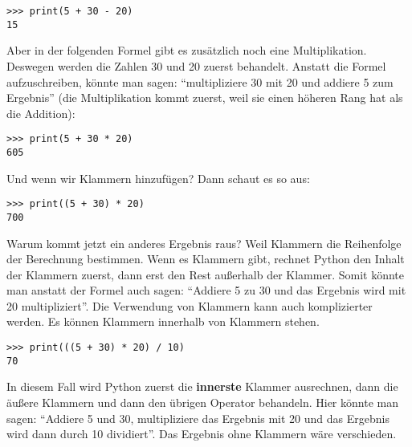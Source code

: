 \begin{Verbatim}[frame=single]
>>> print(5 + 30 - 20)
15
\end{Verbatim}

\noindent
Aber in der folgenden Formel gibt es zusätzlich noch eine Multiplikation. Deswegen werden die Zahlen 30 und 20 zuerst behandelt. Anstatt die Formel aufzuschreiben, könnte man sagen: ``multipliziere 30 mit 20 und addiere 5 zum Ergebnis'' (die Multiplikation kommt zuerst, weil sie einen höheren Rang hat als die Addition):

\begin{Verbatim}[frame=single]
>>> print(5 + 30 * 20)
605
\end{Verbatim}

\noindent
Und wenn wir Klammern hinzufügen? Dann schaut es so aus:

\begin{Verbatim}[frame=single]
>>> print((5 + 30) * 20)
700
\end{Verbatim}

\noindent
Warum kommt jetzt ein anderes Ergebnis raus? Weil Klammern die Reihenfolge der Berechnung bestimmen. Wenn es Klammern gibt, rechnet Python den Inhalt der Klammern zuerst, dann erst den Rest außerhalb der Klammer. Somit könnte man anstatt der Formel auch sagen: ``Addiere 5 zu 30 und das Ergebnis wird mit 20 multipliziert''.
Die Verwendung von Klammern kann auch komplizierter werden. Es können Klammern innerhalb von Klammern stehen.

\begin{Verbatim}[frame=single]
>>> print(((5 + 30) * 20) / 10)
70
\end{Verbatim}

\noindent
In diesem Fall wird Python zuerst die \textbf{innerste} Klammer ausrechnen, dann die äußere Klammern und dann den übrigen Operator behandeln. Hier könnte man sagen: ``Addiere 5 und 30, multipliziere das Ergebnis mit 20 und das Ergebnis wird dann durch 10 dividiert''. Das Ergebnis ohne Klammern wäre verschieden.

